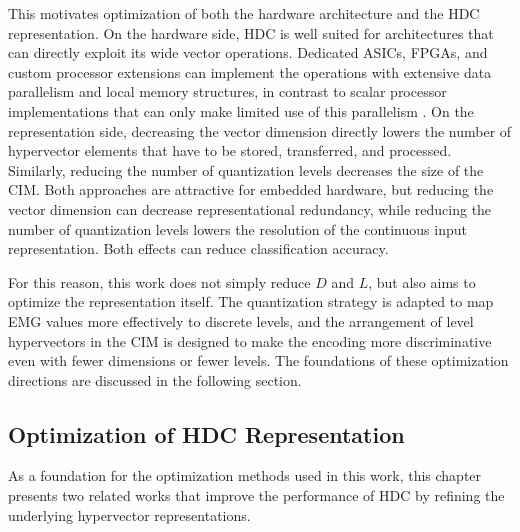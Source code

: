 
   This motivates optimization of both the hardware architecture and the HDC representation. On the hardware side, HDC is well suited for architectures that can directly exploit its wide vector operations. Dedicated ASICs, \acp{FPGA}, and custom processor extensions can implement the operations with extensive data parallelism and local memory structures, in contrast to scalar processor implementations that can only make limited use of this parallelism \cite{martino_configurable_2026}. 
    On the representation side, decreasing the vector dimension directly lowers the number of hypervector elements that have to be stored, transferred, and processed. Similarly, reducing the number of quantization levels decreases the size of the \ac{CIM}. Both approaches are attractive for embedded hardware, but reducing the vector dimension can decrease representational redundancy, while reducing the number of quantization levels lowers the resolution of the continuous input representation. Both effects can reduce classification accuracy.

    For this reason, this work does not simply reduce $D$ and $L$, but also aims to optimize the representation itself. The quantization strategy is adapted to map EMG values more effectively to discrete levels, and the arrangement of level hypervectors in the \ac{CIM} is designed to make the encoding more discriminative even with fewer dimensions or fewer levels. The foundations of these optimization directions are discussed in the following section.

    \subsection{Optimization of HDC Representation}
    \label{sec:optimizationOfHDCRelatedWork}
    As a foundation for the optimization methods used in this work, this chapter presents two related works that improve the performance of HDC by refining the underlying hypervector representations. 
    
